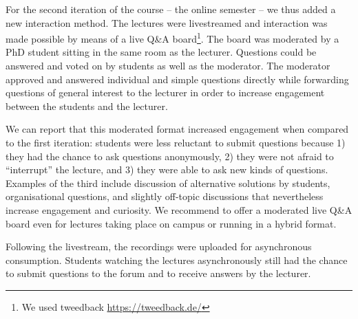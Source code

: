 For the second iteration of the course -- the online semester --
we thus added a new interaction method.
The lectures were livestreamed and
interaction was made possible by means of a live Q\&A board\footnote{We used tweedback \url{https://tweedback.de/}}.
The board was moderated by a PhD student
sitting in the same room as the lecturer.
Questions could be answered and voted on by students as well as the moderator.
The moderator approved and answered individual and simple questions directly while forwarding questions of general interest to the lecturer in order to increase engagement between the students and the lecturer.

We can report that this moderated format increased engagement when compared to the first iteration:
students were less reluctant to submit questions because
1) they had the chance to ask questions anonymously,
2) they were not afraid to ``interrupt'' the lecture, and
3) they were able to ask new kinds of questions.
Examples of the third include discussion of alternative solutions by students,
organisational questions,
and slightly off-topic discussions that nevertheless increase engagement and curiosity.
We recommend to offer a moderated live Q\&A board even for lectures taking place on campus or running in a hybrid format.

Following the livestream,
the recordings were uploaded for asynchronous consumption.
Students watching the lectures asynchronously still had the chance to submit questions to the forum and to receive answers by the lecturer.

